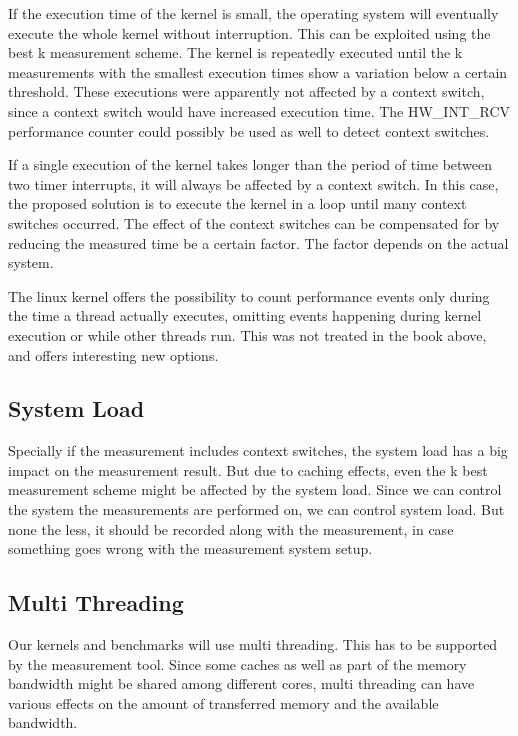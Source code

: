 \documentclass[a4paper,12pt]{article}
\begin{document}
If the execution time of the kernel is small, the operating system will
eventually execute the whole kernel without interruption. This can be exploited
using the best k measurement scheme. The kernel is repeatedly executed until the
k measurements with the smallest execution times show a variation below a
certain threshold. These executions were apparently not affected by a context
switch, since a context switch would have increased execution time. The
HW\_INT\_RCV performance counter could possibly be used as well to detect
context switches.

If a single execution of the kernel takes longer than the period of time between
two timer interrupts, it will always be affected by a context switch. In this
case, the proposed solution is to execute the kernel in a loop until many
context switches occurred. The effect of the context switches can be compensated
for by reducing the measured time be a certain factor. The factor depends on the
actual system.

The linux kernel offers the possibility to count performance events only during
the time a thread actually executes, omitting events happening during kernel
execution or while other threads run. This was not treated in the book above,
and offers interesting new options.



\subsection{System Load}
Specially if the measurement includes context switches, the system load has a
big impact on the measurement result. But due to caching effects, even the k
best measurement scheme might be affected by the system load. Since we can
control the system the measurements are performed on, we can control system
load. But none the less, it should be recorded along with the measurement, in
case something goes wrong with the measurement system setup.

\subsection{Multi Threading}
Our kernels and benchmarks will use multi threading. This has to be supported by
the measurement tool. Since some caches as well as part of the memory bandwidth
might be shared among different cores, multi threading can have various effects
on the amount of transferred memory and the available bandwidth.
\end{document}
